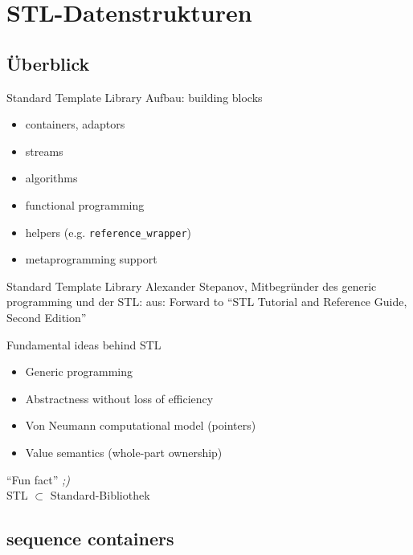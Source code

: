 \section{STL-Datenstrukturen}

\subsection{Überblick}

\begin{frame}[fragile]{Standard Template Library}
	Aufbau: building blocks
	
	\vspace{1em}
	
	\begin{itemize}
		\item containers, adaptors
		\item streams
		\item algorithms
		\item functional programming
		\item helpers (e.g. \verb|reference_wrapper|)
		\item metaprogramming support
	\end{itemize}
\end{frame}

\begin{frame}[fragile]{Standard Template Library}
	Alexander Stepanov, Mitbegründer des generic programming und der STL:
	{\tiny aus: Forward to \enquote{STL Tutorial and Reference Guide, Second Edition} }
	
	\begin{block}{Fundamental ideas behind STL}
		\begin{itemize}
			\item Generic programming
			\item Abstractness without loss of efficiency
			\item Von Neumann computational model (pointers)
			\item Value semantics (whole-part ownership)
		\end{itemize}
	\end{block}
	
	\pause
	
	\vspace{2em}
	\enquote{Fun fact} \emph{;)}\\
	STL $\subset$ Standard-Bibliothek
\end{frame}


\subsection{sequence containers}

